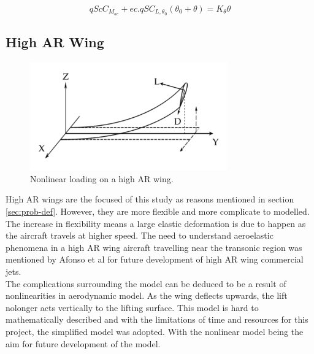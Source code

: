 \documentclass[11pt]{article}
\begin{document}

\begin{equation}
qScC_{M_{ac}} + ec. qSC_{L,{\theta _0}}(\theta _0 + \theta) = K_{\theta}\theta
\end{equation}
\fi
\newpage
\subsection{High AR Wing}
\label{sec:high-AR}
\begin{figure}
    \centering
    \includegraphics[width = 8.5cm]{figures/Eaton-highly-flexible-wing.png}
    \caption{Nonlinear loading on a high AR wing.}
    \label{fig:high-AR-load}
\end{figure}
High AR wings are the focused of this study as reasons mentioned in section \ref{sec:prob-def}. However, they are more flexible and more complicate to modelled. The increase in flexibility means a large elastic deformation is due to happen as the aircraft travels at higher speed. The need to understand aeroelastic phenomena in a high AR wing aircraft travelling near the transonic region was mentioned by Afonso et al \cite{Afonso2017AWings} for future development of high AR wing commercial jets.\\

 The complications surrounding the model can be deduced to be a result of nonlinearities in aerodynamic model. As the wing deflects upwards, the lift nolonger acts vertically to the lifting surface. This model is hard to mathematically described and with the limitations of time and resources for this project, the simplified model was adopted. With the nonlinear model being the aim for future development of the model.
\end{document}
